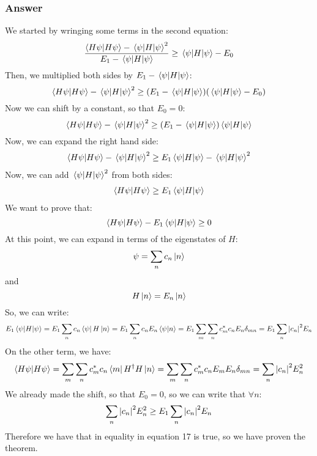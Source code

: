 \documentclass{article}[16pt]
\begin{document}
\subsubsection{Answer}
We started by wringing some terms in the second equation:
\begin{equation}
    \frac{\bra{H\psi  }\ket{H\psi  } - \expval{H}{\psi}^2}{E_1 - \expval{H}{\psi}} \geq \expval{H}{\psi} - E_0
\end{equation}
Then, we multiplied both sides by $E_1 - \expval{H}{\psi}$:
\begin{equation}
    \bra{H\psi  }\ket{H\psi  } - \expval{H}{\psi}^2 \geq (E_1 - \expval{H}{\psi})(\expval{H}{\psi} - E_0)
\end{equation}
Now we can shift by a constant, so that $E_0 = 0$:
\begin{equation}
    \bra{H\psi  }\ket{H\psi  } - \expval{H}{\psi}^2 \geq (E_1 - \expval{H}{\psi})\expval{H}{\psi}
\end{equation}
Now, we can expand the right hand side:
\begin{align*}
    \bra{H\psi  }\ket{H\psi  } - \expval{H}{\psi}^2 &\geq E_1\expval{H}{\psi} - \expval{H}{\psi}^2 \\
\end{align*}
Now, we can add $\expval{H}{\psi}^2$ from both sides:
\begin{align*}
    \bra{H\psi  }\ket{H\psi  } &\geq E_1\expval{H}{\psi} \\
\end{align*}
We want to prove that:
\begin{equation}
    \bra{H\psi  }\ket{H\psi  } - E_1\expval{H}{\psi} \geq 0
\end{equation}
At this point, we can expand in terms of the eigenstates of $H$:
\begin{equation}
    \psi = \sum_{n} c_n \ket{n}
\end{equation}
and
\begin{equation}
    H\ket{n} = E_n \ket{n}
\end{equation}
So, we can write:
\begin{equation}
    E_1\expval{H}{\psi} = E_1 \sum_{n} c_n \bra{\psi } H \ket{n} = E_1 \sum_{n} c_n E_n \bra{\psi } \ket{n} = E_1 \sum_{m}\sum_{n}c_m^* c_n E_n \delta_{mn} = E_1 \sum_{n} \abs{c_n}^2 E_n  
\end{equation}
On the other term, we have:
\begin{equation}
    \bra{H\psi  }\ket{H\psi  } = \sum_{m}\sum_{n}c_m^* c_n \bra{m} H^\dag H \ket{n} = \sum_{m}\sum_{n}c_m^* c_n E_m E_n \delta_{mn} = \sum_{n} \abs{c_n}^2 E_n^2
\end{equation}
We already made the shift, so that $E_0 = 0$, so we can write that $\forall n$:
\begin{equation}
    \sum_{n} \abs{c_n}^2 E_n^2 \geq E_1 \sum_{n} \abs{c_n}^2 E_n
\end{equation}
Therefore we have that in equality in equation 17 is true, so we have proven the theorem.
\end{document}
